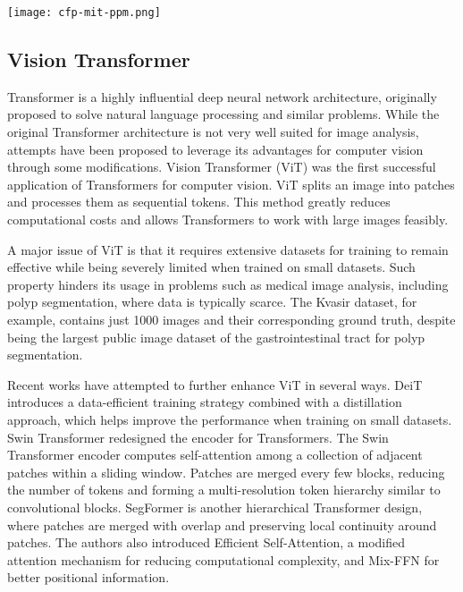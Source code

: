 \documentclass{article}
\newcommand{\ModelName}{ColonFormer}
\begin{document}
\begin{figure*}[ht!]
\centering
\texttt{[image: cfp-mit-ppm.png]} 
\caption{The architecture of three neural blocks used in our \ModelName. The left block (a) is the Mix Transformer block  \cite{segformer}. The middle block (b) is the channel-wise feature pyramid block. The pyramid pooling module is shown on the right (c). Here DR stands for dilation rate.}
\label{fig:cfp-mit-ppm}
\end{figure*}

\subsection{Vision Transformer}
Transformer \cite{transformer2017} is a highly influential deep neural network architecture, originally proposed to solve natural language processing and similar problems. While the original Transformer architecture is not very well suited for image analysis, attempts have been proposed to leverage its advantages for computer vision through some modifications. Vision Transformer (ViT) \cite{vit} was the first successful application of Transformers for computer vision. ViT splits an image into patches and processes them as sequential tokens. This method greatly reduces computational costs and allows Transformers to work with large images feasibly. 

A major issue of ViT is that it requires extensive datasets for training to remain effective while being severely limited when trained on small datasets. Such property hinders its usage in problems such as medical image analysis, including polyp segmentation, where data is typically scarce. The Kvasir dataset, for example, contains just 1000 images and their corresponding ground truth, despite being the largest public image dataset of the gastrointestinal tract for polyp segmentation. 

Recent works have attempted to further enhance ViT in several ways. DeiT \cite{deit} introduces a data-efficient training strategy combined with a distillation approach, which helps improve the performance when training on small datasets. Swin Transformer \cite{swin} redesigned the encoder for Transformers. The Swin Transformer encoder computes self-attention among a collection of adjacent patches within a sliding window. Patches are merged every few blocks, reducing the number of tokens and forming a multi-resolution token hierarchy similar to convolutional blocks. SegFormer \cite{segformer} is another hierarchical Transformer design, where patches are merged with overlap and preserving local continuity around patches. The authors also introduced Efficient Self-Attention, a modified attention mechanism for reducing computational complexity, and Mix-FFN for better positional information.
\end{document}
